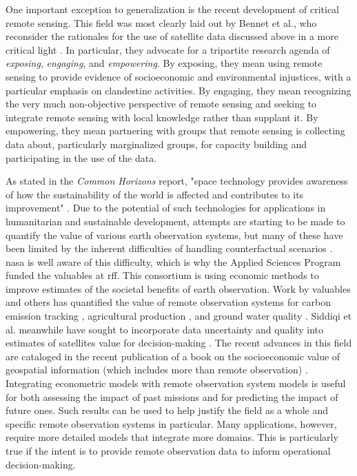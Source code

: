 One important exception to generalization is the recent development of critical remote sensing. This field was most clearly laid out by Bennet et al., who reconsider the rationales for the use of satellite data discussed above in a more critical light \cite{bennettPoliticsPixelsReview2022}. In particular, they advocate for a tripartite research agenda of \textit{exposing}, \textit{engaging}, and \textit{empowering}. By exposing, they mean using remote sensing to provide evidence of socioeconomic and environmental injustices, with a particular emphasis on clandestine activities. By engaging, they mean recognizing the very much non-objective perspective of remote sensing and seeking to integrate remote sensing with local knowledge rather than supplant it. By empowering, they mean partnering with groups that remote sensing is collecting data about, particularly marginalized groups, for capacity building and participating in the use of the data.

As stated in the \textit{Common Horizons} report, "space technology provides awareness of how the sustainability of the world is affected and contributes to its improvement" \cite{southernhemispheresummerspaceprogram2013CommonHorizonsWhite2013}. Due to the potential of such technologies for applications in humanitarian and sustainable development, attempts are starting to be made to quantify the value of various earth observation systems, but many of these have been limited by the inherent difficulties of handling counterfactual scenarios \cite{macauleyValueInformationMeasuring2006}. \ac{nasa} is well aware of this difficulty, which is why the Applied Sciences Program funded the \ac{valuables} at \ac{rff}. This consortium is using economic methods to improve estimates of the societal benefits of earth observation. Work by \ac{valuables} and others has quantified the value of remote observation systems for carbon emission tracking \cite{cookeUsingSocialCost2016}, agricultural production \cite{forneyEconomicValueRemoteSensing2012}, and ground water quality \cite{forneyEconomicValueRemoteSensing2012}. Siddiqi et al. meanwhile have sought to incorporate data uncertainty and quality into estimates of satellites value for decision-making \cite{siddiqiIntegratingGloballyDispersed2020, siddiqiValuingRadiometricQuality2021}. The recent advances in this field are cataloged in the recent publication of a book on the socioeconomic value of geospatial information (which includes more than remote observation) \cite{kruseGEOValueSocioeconomicValue2017}. Integrating econometric models with remote observation system models is useful for both assessing the impact of past missions and for predicting the impact of future ones. Such results can be used to help justify the field as a whole and specific remote observation systems in particular. Many applications, however, require more detailed models that integrate more domains. This is particularly true if the intent is to provide remote observation data to inform operational decision-making.

